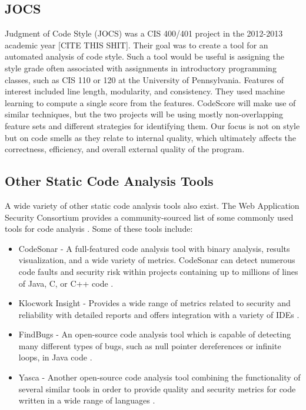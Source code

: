 \documentclass{sig-alternate}
\begin{document}
\subsection{JOCS}
Judgment of Code Style (JOCS) was a CIS 400/401 project in the 2012-2013
academic year [CITE THIS SHIT]. Their goal was to create a tool for an automated
analysis of code style. Such a tool would be useful is assigning the style grade
often associated with assignments in introductory programming classes, such as
CIS 110 or 120 at the University of Pennsylvania. Features of interest included
line length, modularity, and consistency. They used machine learning to compute
a single score from the features. CodeScore will make use of similar techniques,
but the two projects will be using mostly non-overlapping feature sets and
different strategies for identifying them. Our focus is not on style but on code
smells as they relate to internal quality, which ultimately affects the
correctness, efficiency, and overall external quality of the program. 

\subsection{Other Static Code Analysis Tools}
A wide variety of other static code analysis tools also exist. The Web Application Security Consortium provides a community-sourced list of some commonly used tools for code analysis \cite{webappsec2012}. Some of these tools include:

\begin{itemize}
	\item CodeSonar - A full-featured code analysis tool with binary analysis, results visualization, and a wide variety of metrics. CodeSonar can detect numerous code faults and security risk within projects containing up to millions of lines of Java, C, or C++ code \cite{grammatech2013codesonar}.
	\item Klocwork Insight - Provides a wide range of metrics related to security and reliability with detailed reports and offers integration with a variety of IDEs \cite{klocwork2013insight}.
	\item FindBugs - An open-source code analysis tool which is capable of detecting many different types of bugs, such as null pointer dereferences or infinite loops, in Java code \cite{pugh2013findbugs}.
	\item Yasca - Another open-source code analysis tool combining the functionality of several similar tools in order to provide quality and security metrics for code written in a wide range of languages \cite{scovetta2007yasca}.
\end{itemize}
\end{document}
